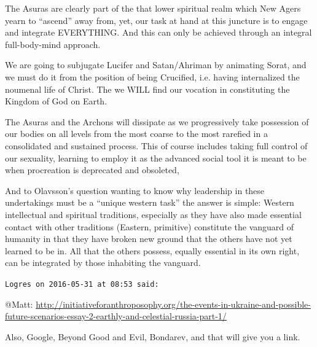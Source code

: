 \begin{footnotesize}
\begin{sffamily}
The Asuras are clearly part of the that lower spiritual realm which New Agers yearn to ``ascend'' away from, yet, our task at hand at this juncture is to engage and integrate EVERYTHING. And this can only be achieved through an integral full-body-mind approach.

We are going to subjugate Lucifer and Satan/Ahriman by animating Sorat, and we must do it from the position of being Crucified, i.e. having internalized the noumenal life of Christ. The we WILL find our vocation in constituting the Kingdom of God on Earth.

The Asuras and the Archons will dissipate as we progressively take possession of our bodies on all levels from the most coarse to the most rarefied in a consolidated and sustained process. This of course includes taking full control of our sexuality, learning to employ it as the advanced social tool it is meant to be when procreation is deprecated and obsoleted,

And to Olavsson's question wanting to know why leadership in these undertakings must be a ``unique western task'' the answer is simple: Western intellectual and spiritual traditions, especially as they have also made essential contact with other traditions (Eastern, primitive) constitute the vanguard of humanity in that they have broken new ground that the others have not yet learned to be in. All that the others possess, equally essential in its own right, can be integrated by those inhabiting the vanguard.

\hfill

\texttt{Logres on 2016-05-31 at 08:53 said:}

@Matt:
\url{http://initiativeforanthroposophy.org/the-events-in-ukraine-and-possible-future-scenarios-essay-2-earthly-and-celestial-russia-part-1/}

Also, Google, Beyond Good and Evil, Bondarev, and that will give you a link.


\hfill

\end{sffamily}
\end{footnotesize}

